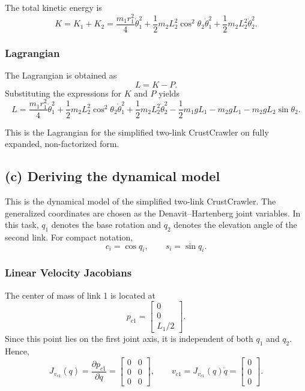 \documentclass{article}
\begin{document}
The total kinetic energy is
\[
K = K_1 + K_2
= \frac{m_1 r_1^2}{4}\dot{\theta}_1^2
+ \frac{1}{2} m_2 L_2^2 \cos^2\theta_2 \dot{\theta}_1^2
+ \frac{1}{2} m_2 L_2^2 \dot{\theta}_2^2.
\]

\subsubsection*{Lagrangian}

The Lagrangian is obtained as
\[
L = K - P.
\]
Substituting the expressions for \(K\) and \(P\) yields
\[
L =
\frac{m_1 r_1^2}{4}\dot{\theta}_1^2
+ \frac{1}{2} m_2 L_2^2 \cos^2\theta_2 \dot{\theta}_1^2
+ \frac{1}{2} m_2 L_2^2 \dot{\theta}_2^2
- \frac{1}{2} m_1 g L_1
- m_2 g L_1
- m_2 g L_2 \sin\theta_2.
\]

This is the Lagrangian for the simplified two-link CrustCrawler on fully expanded, non-factorized form.


\subsection*{(c) Deriving the dynamical model}

This is the dynamical model of the simplified two-link CrustCrawler. The generalized coordinates are chosen as the Denavit--Hartenberg joint variables.
In this task, \(q_1\) denotes the base rotation and \(q_2\) denotes the elevation angle of the second link. For compact notation,
\[
c_i = \cos q_i,\qquad s_i = \sin q_i.
\]

\subsubsection*{Linear Velocity Jacobians}

The center of mass of link 1 is located at
\[
p_{c1} =
\begin{bmatrix}
0\\
0\\
L_1/2
\end{bmatrix}.
\]
Since this point lies on the first joint axis, it is independent of both \(q_1\) and \(q_2\). Hence,
\[
J_{v_{c1}}(q)
=
\frac{\partial p_{c1}}{\partial q}
=
\begin{bmatrix}
0 & 0\\
0 & 0\\
0 & 0
\end{bmatrix},
\qquad
v_{c1}=J_{v_{c1}}(q)\dot q=
\begin{bmatrix}
0\\
0\\
0
\end{bmatrix}.
\]
\end{document}
